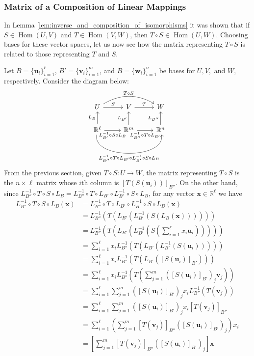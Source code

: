 \documentclass[12pt,letterpaper,reqno]{article}
\numberwithin{equation}{section}
\newcommand{\R}{\ensuremath{\mathbb R}}
\newcommand{\bv}{\mathbf{v}}
\newcommand{\bw}{\mathbf{w}}
\newcommand{\bu}{\mathbf{u}}
\newcommand{\bx}{\mathbf{x}}
\DeclareMathOperator{\Hom}{Hom}
\begin{document}
\subsubsection{Matrix of a Composition of Linear Mappings}
In Lemma \ref{lem:inverse_and_composition_of_isomorphisms} it was shown that if $S \in \Hom(U,V)$ and $T \in \Hom(V,W)$, then $T \circ S \in \Hom(U,W)$. Choosing bases for these vector spaces, let us now see how the matrix representing $T \circ S$ is related to those representing $T$ and $S$.

Let $B=\{\bu_i\}_{i=1}^\ell$, $B'=\{\bv_i\}_{i=1}^m$, and $B=\{\bw_i\}_{i=1}^n$ be bases for $U,V,$ and $W$, respectively.   
Consider the diagram below:
\begin{equation*}
	\begin{tikzcd}
		U \arrow[rr, "T \circ S", bend left=30]\arrow[r,"S"] & V \arrow[r,"T"] & W \\
		\R^\ell \arrow[rr, swap, "L_{B''}^{-1}\circ T \circ L_{B'} \circ L_{B'}^{-1}\circ S \circ L_B", bend right=100]\arrow[u,"L_B"] \arrow[r,swap,"L_{B'}^{-1}\circ S \circ L_B"]& \R^m \arrow[u,"L_{B'}"] \arrow[r,swap,"L_{B''}^{-1}\circ T \circ L_{B'}"]& \R^n \arrow[u,"L_{B''}"]
	\end{tikzcd}
\end{equation*}
From the previous section, given $T \circ S:U \to W$, the matrix representing $T \circ S$ is the $n \times \ell$ matrix whose $i$th column is $[T(S(\bu_i))]_{B''}$. On the other hand, since $L_{B''}^{-1}\circ T \circ S \circ L_B=L_{B''}^{-1}\circ T \circ L_{B'} \circ L_{B'}^{-1}\circ S \circ L_B$, for any vector $\bx \in \R^\ell$ we have
\begin{align*}
	L_{B''}^{-1}\circ T \circ S \circ L_B(\bx)&=L_{B''}^{-1}\circ T \circ L_{B'} \circ L_{B'}^{-1}\circ S \circ L_B(\bx) \\
	&=L_{B''}^{-1}(T(L_{B'}(L_{B'}^{-1}(S(L_B(\bx)))))) \\
	&=L_{B''}^{-1}(T(L_{B'}(L_{B'}^{-1}(S(\sum_{i=1}^\ell x_i\bu_i))))) \\
	&=\sum_{i=1}^\ell x_iL_{B''}^{-1}(T(L_{B'}(L_{B'}^{-1}(S(\bu_i))))) \\
	&=\sum_{i=1}^\ell x_iL_{B''}^{-1}(T(L_{B'}([S(\bu_i)]_{B'}))) \\
	&=\sum_{i=1}^\ell x_iL_{B''}^{-1}(T(\sum_{j=1}^m([S(\bu_i)]_{B'})_j\bv_j)) \\
	&=\sum_{i=1}^\ell \sum_{j=1}^m([S(\bu_i)]_{B'})_jx_iL_{B''}^{-1}(T(\bv_j)) \\
	&=\sum_{i=1}^\ell \sum_{j=1}^m([S(\bu_i)]_{B'})_jx_i[T(\bv_j)]_{B''} \\
	&=\sum_{i=1}^\ell \left(\sum_{j=1}^m[T(\bv_j)]_{B''}([S(\bu_i)]_{B'})_j\right)x_i \\
	&=\left[\sum_{j=1}^m[T(\bv_j)]_{B''}([S(\bu_i)]_{B'})_j\right]\bx
\end{align*}
\end{document}
